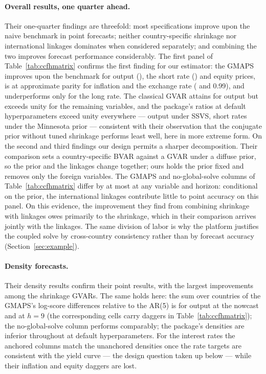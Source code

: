 \paragraph{Overall results, one quarter ahead.} Their one-quarter findings are threefold:
most specifications improve upon the naive benchmark in point forecasts; neither
country-specific shrinkage nor international linkages dominates when considered
separately; and combining the two improves forecast performance considerably. The first
panel of Table~\ref{tab:ccfhmatrix} confirms the first finding for our estimator: the
GMAPS improves upon the benchmark for output (\CmGbvarYHOne{}), the short rate
(\CmGbvarRHOne{}) and equity prices, is at approximate parity for inflation and the
exchange rate (\CmGbvarDpHOne{} and 0.99), and underperforms only for the long rate. The
classical GVAR attains \CmToolboxYHOne{} for output but exceeds unity for the remaining
variables, and the package's ratios at default hyperparameters exceed unity everywhere
--- output \CmSsvsYHOne{} under SSVS, short rates \CmMnRHOne{} under the Minnesota prior
--- consistent with their observation that the conjugate prior without tuned shrinkage
performs least well, here in more extreme form. On the second and third findings our
design permits a sharper decomposition. Their comparison sets a country-specific BVAR
against a GVAR under a diffuse prior, so the prior and the linkages change together; ours
holds the prior fixed and removes only the foreign variables. The GMAPS and
no-global-solve columns of Table~\ref{tab:ccfhmatrix} differ by at most
\CmStarsNostarsGap{} at any variable and horizon: conditional on the prior, the
international linkages contribute little to point accuracy on this panel. On this
evidence, the improvement they find from combining shrinkage with linkages owes primarily
to the shrinkage, which in their comparison arrives jointly with the linkages. The same
division of labor is why the platform justifies the coupled solve by cross-country
consistency rather than by forecast accuracy (Section~\ref{sec:example}).

\paragraph{Density forecasts.} Their density results confirm their point results, with
the largest improvements among the shrinkage GVARs. The same holds here: the sum over
countries of the GMAPS's log-score differences relative to the AR(5) is
\CmGbvarYLpsHOne{} for output at the nowcast and \CmGbvarYLpsHNine{} at $h=9$ (the
corresponding cells carry daggers in Table~\ref{tab:ccfhmatrix}); the no-global-solve
column performs comparably; the package's densities are inferior throughout at default
hyperparameters. For the interest rates the anchored columns match the unanchored
densities once the rate targets are consistent with the yield curve --- the design
question taken up below --- while their inflation and equity daggers are lost.


